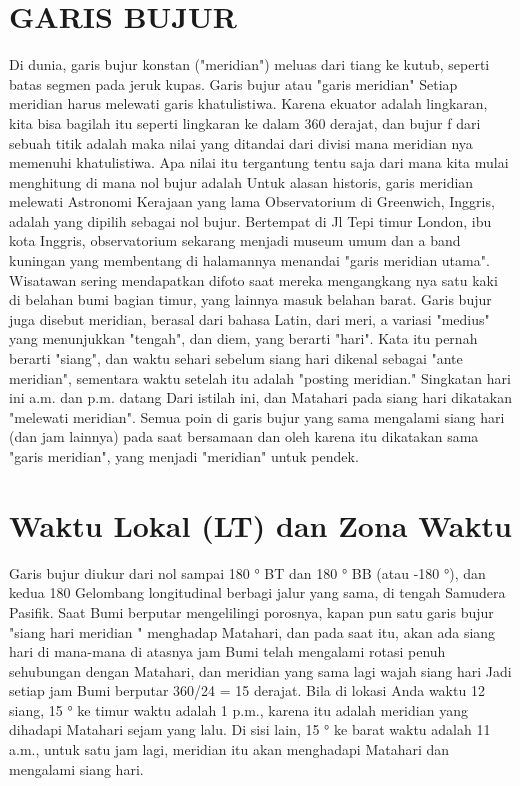 \section{GARIS BUJUR}
	Di dunia, garis bujur konstan ("meridian") meluas dari tiang ke kutub, seperti
	batas segmen pada jeruk kupas.
	Garis bujur atau "garis meridian"
	Setiap meridian harus melewati garis khatulistiwa. Karena ekuator adalah lingkaran, kita bisa
	bagilah itu seperti lingkaran ke dalam 360 derajat, dan bujur f dari sebuah titik adalah
	maka nilai yang ditandai dari divisi mana meridian nya memenuhi khatulistiwa.
	Apa nilai itu tergantung tentu saja dari mana kita mulai menghitung di mana
	nol bujur adalah Untuk alasan historis, garis meridian melewati Astronomi Kerajaan yang lama
	Observatorium di Greenwich, Inggris, adalah yang dipilih sebagai nol bujur. Bertempat di Jl
	Tepi timur London, ibu kota Inggris, observatorium sekarang menjadi museum umum dan a
	band kuningan yang membentang di halamannya menandai "garis meridian utama". Wisatawan sering mendapatkan
	difoto saat mereka mengangkang nya satu kaki di belahan bumi bagian timur, yang lainnya masuk belahan barat.
	Garis bujur juga disebut meridian, berasal dari bahasa Latin, dari meri, a
	variasi "medius" yang menunjukkan "tengah", dan diem, yang berarti "hari". Kata itu
	pernah berarti "siang", dan waktu sehari sebelum siang hari dikenal sebagai "ante meridian",
	sementara waktu setelah itu adalah "posting meridian." Singkatan hari ini a.m. dan p.m. datang
	Dari istilah ini, dan Matahari pada siang hari dikatakan "melewati meridian". Semua poin di
	garis bujur yang sama mengalami siang hari (dan jam lainnya) pada saat bersamaan dan
	oleh karena itu dikatakan sama "garis meridian", yang menjadi "meridian" untuk
	pendek.

\section{Waktu Lokal (LT) dan Zona Waktu}
	Garis bujur diukur dari nol sampai 180 ° BT dan 180 ° BB (atau -180 °), dan kedua 180
	Gelombang longitudinal berbagi jalur yang sama, di tengah Samudera Pasifik.
	Saat Bumi berputar mengelilingi porosnya, kapan pun satu garis bujur "siang hari
	meridian " menghadap Matahari, dan pada saat itu, akan ada siang hari di mana-mana di atasnya
	jam Bumi telah mengalami rotasi penuh sehubungan dengan Matahari, dan meridian yang sama
	lagi wajah siang hari Jadi setiap jam Bumi berputar 360/24 = 15 derajat.
	Bila di lokasi Anda waktu 12 siang, 15 ° ke timur waktu adalah 1 p.m., karena itu adalah
	meridian yang dihadapi Matahari sejam yang lalu. Di sisi lain, 15 ° ke barat waktu adalah 11
	a.m., untuk satu jam lagi, meridian itu akan menghadapi Matahari dan mengalami siang hari.

